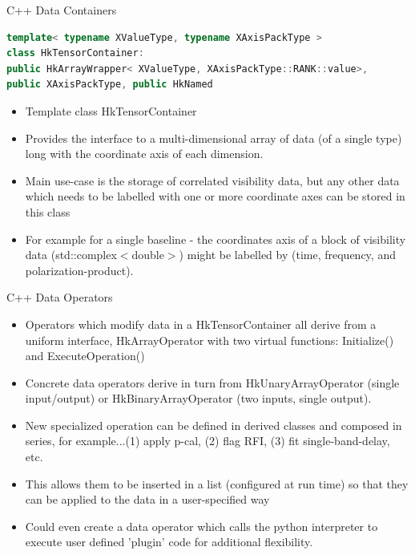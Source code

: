 \documentclass[xcolor=svgnames]{beamer}
\begin{document}
\begin{frame}[fragile]{C++ Data Containers}

\begin{lstlisting}[language=C++,basicstyle=\ttfamily\tiny,keywordstyle=\color{red}]
template< typename XValueType, typename XAxisPackType >
class HkTensorContainer: 
public HkArrayWrapper< XValueType, XAxisPackType::RANK::value>, 
public XAxisPackType, public HkNamed
\end{lstlisting}

\begin{itemize}
\item Template class HkTensorContainer
\item Provides the interface to a multi-dimensional array of data (of a single type) long with the coordinate axis of each dimension.
\item Main use-case is the storage of correlated visibility data, but any other data which needs to be labelled with one or more coordinate axes can be stored in this class
\item For example for a single baseline - the coordinates axis of a block of visibility data (std::complex$<$double$>$) might be labelled by (time, frequency, and polarization-product).
\end{itemize}

\end{frame}


\begin{frame}{C++ Data Operators}

\begin{itemize}
\item Operators which modify data in a HkTensorContainer all derive from a uniform interface, HkArrayOperator with two virtual functions: Initialize() and ExecuteOperation()
\item Concrete data operators derive in turn from HkUnaryArrayOperator (single input/output) or HkBinaryArrayOperator (two inputs, single output).
\item New specialized operation can be defined in derived classes and composed in series, for example...(1) apply p-cal, (2) flag RFI, (3) fit single-band-delay, etc.
\item This allows them to be inserted in a list (configured at run time) so that they can be applied to the data in a user-specified way
\item Could even create a data operator which calls the python interpreter to execute user defined 'plugin' code for additional flexibility.
\end{itemize}

\end{frame}
\end{document}
